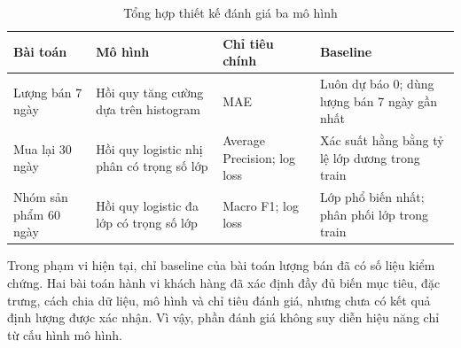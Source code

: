 \begin{table}[H]\centering
\caption{Tổng hợp thiết kế đánh giá ba mô hình}
\label{tab:ml-evaluation-summary}
\begin{tabularx}{\textwidth}{|p{3.2cm}|p{4.2cm}|p{3.5cm}|X|}\hline
\textbf{Bài toán} & \textbf{Mô hình} & \textbf{Chỉ tiêu chính} & \textbf{Baseline} \\ \hline
Lượng bán 7 ngày & Hồi quy tăng cường dựa trên histogram & MAE & Luôn dự báo 0; dùng lượng bán 7 ngày gần nhất \\ \hline
Mua lại 30 ngày & Hồi quy logistic nhị phân có trọng số lớp & Average Precision; log loss & Xác suất hằng bằng tỷ lệ lớp dương trong train \\ \hline
Nhóm sản phẩm 60 ngày & Hồi quy logistic đa lớp có trọng số lớp & Macro F1; log loss & Lớp phổ biến nhất; phân phối lớp trong train \\ \hline
\end{tabularx}
\end{table}

Trong phạm vi hiện tại, chỉ baseline của bài toán lượng bán đã có số liệu kiểm chứng. Hai bài toán hành vi khách hàng đã xác định đầy đủ biến mục tiêu, đặc trưng, cách chia dữ liệu, mô hình và chỉ tiêu đánh giá, nhưng chưa có kết quả định lượng được xác nhận. Vì vậy, phần đánh giá không suy diễn hiệu năng chỉ từ cấu hình mô hình.
